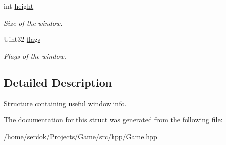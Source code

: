 \begin{DoxyCompactItemize}
\mbox{\label{structSDL__WindowInfo_abb321b367d4221fac50b8d10f03283c2}} 
int \hyperlink{structSDL__WindowInfo_abb321b367d4221fac50b8d10f03283c2}{height}
\begin{DoxyCompactList}\small\item\em Size of the window. \end{DoxyCompactList}\item 
\mbox{\label{structSDL__WindowInfo_a54b7260c4504d9cc2dbe3a910811171c}} 
Uint32 \hyperlink{structSDL__WindowInfo_a54b7260c4504d9cc2dbe3a910811171c}{flags}
\begin{DoxyCompactList}\small\item\em Flags of the window. \end{DoxyCompactList}\end{DoxyCompactItemize}


\subsection{Detailed Description}
Structure containing useful window info. 

The documentation for this struct was generated from the following file\+:\begin{DoxyCompactItemize}
\item 
/home/serdok/\+Projects/\+Game/src/hpp/Game.\+hpp\end{DoxyCompactItemize}
